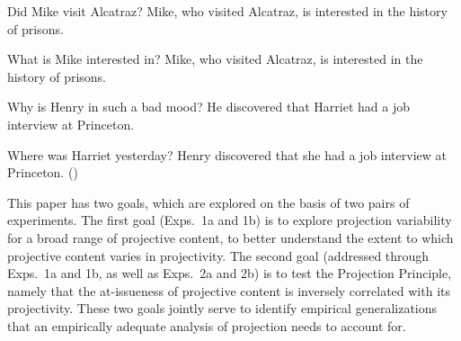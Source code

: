\documentclass[11pt,fleqn]{article}
\newcommand{\6}{\mbox{$[\hspace*{-.6mm}[$}}
\newcommand{\9}{\mbox{$]\hspace*{-.6mm}]$}}
\def\infelic{{\leavevmode\llap{\#}}}
\begin{document}
\begin{exe}
\ex\label{nrrc}
\begin{xlist}
\ex
\begin{xlist}
 Did Mike visit Alcatraz?
 \infelic Mike, who visited Alcatraz, is interested in the history of prisons.
\end{xlist}


\ex
\begin{xlist}
 What is Mike interested in?
 Mike, who visited Alcatraz, is interested in the history of prisons.
\end{xlist}


\end{xlist}

\ex\label{discover}
\begin{xlist}

\ex
\begin{xlist}
 Why is Henry in such a bad mood?
 He discovered that Harriet had a job interview at Princeton. 
\end{xlist}

\ex
\begin{xlist}
 Where was Harriet yesterday?
 Henry discovered that she had a job interview at Princeton. \hfill (\citealt[1035]{simons07})
\end{xlist}
\end{xlist}
\end{exe}

This paper has two goals, which are explored on the basis of two pairs of experiments. The first goal (Exps.~1a and 1b) is to explore projection variability for a broad range of projective content, to better understand the extent to which projective content varies in  projectivity. The second goal (addressed through Exps.~1a and 1b, as well as Exps.~2a and 2b) is to test the Projection Principle, namely that the at-issueness of projective content is inversely correlated with its projectivity. These two goals jointly serve to identify empirical generalizations that an empirically adequate analysis of projection needs to account for. 
\end{document}
